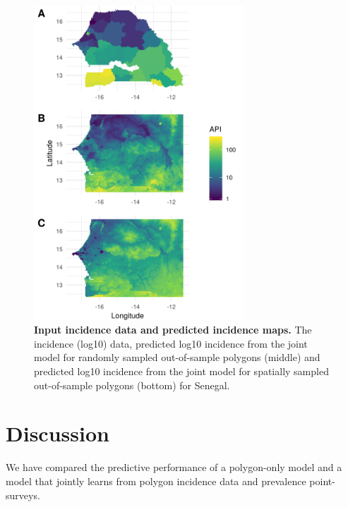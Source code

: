 \documentclass[10pt,letterpaper]{article}
\begin{document}
\begin{figure}
\includegraphics[width = 0.7\textwidth]{figures/sen_both_cv12_preds.png}
\caption{{\bf Input incidence data and predicted incidence maps. } 
The incidence (log10) data, predicted log10 incidence from the joint model for randomly sampled out-of-sample polygons (middle) and predicted log10 incidence from the joint model for spatially sampled out-of-sample polygons (bottom) for Senegal.
}
\label{predobsmapsen}
\end{figure}


\section*{Discussion}



We have compared the predictive performance of a polygon-only model and a model that jointly learns from polygon incidence data and prevalence point-surveys.
\end{document}
